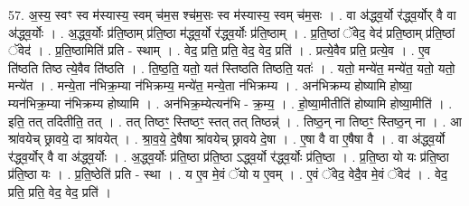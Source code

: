 \documentclass[17pt]{extarticle}
\begin{document}
57. अ॒स्य॒ स्वꣳ स्व म॑स्यास्य॒ स्वम् च॑म॒स श्च॑म॒सः स्व म॑स्यास्य॒ स्वम् च॑म॒सः । . वा अ॑द्ध्व॒र्यो र॑द्ध्व॒र्योर् वै वा अ॑द्ध्व॒र्योः । . अ॒द्ध्व॒र्योः प्र॑ति॒ष्ठाम् प्र॑ति॒ष्ठा म॑द्ध्व॒र्यो र॑द्ध्व॒र्योः प्र॑ति॒ष्ठाम् । . प्र॒ति॒ष्ठां ॅवेद॒ वेद॑ प्रति॒ष्ठाम् प्र॑ति॒ष्ठां ॅवेद॑ । . प्र॒ति॒ष्ठामिति॑ प्रति - स्थाम् । . वेद॒ प्रति॒ प्रति॒ वेद॒ वेद॒ प्रति॑ । . प्रत्ये॒वैव प्रति॒ प्रत्ये॒व । . ए॒व ति॑ष्ठति तिष्ठ त्ये॒वैव ति॑ष्ठति । . ति॒ष्ठ॒ति॒ यतो॒ यत॑ स्तिष्ठति तिष्ठति॒ यतः॑ । . यतो॒ मन्ये॑त॒ मन्ये॑त॒ यतो॒ यतो॒ मन्ये॑त । . मन्ये॒ता न॑भिक्र॒म्या न॑भिक्रम्य॒ मन्ये॑त॒ मन्ये॒ता न॑भिक्रम्य । . अन॑भिक्रम्य होष्यामि होष्या॒ म्यन॑भिक्र॒म्या न॑भिक्रम्य होष्यामि । . अन॑भिक्र॒म्येत्यन॑भि - क्र॒म्य॒ । . हो॒ष्या॒मीतीति॑ होष्यामि होष्या॒मीति॑ । . इति॒ तत् तदितीति॒ तत् । . तत् तिष्ठꣳ॒॒ स्तिष्ठꣳ॒॒ स्तत् तत् तिष्ठन्न्॑ । . तिष्ठ॒न् ना तिष्ठꣳ॒॒ स्तिष्ठ॒न् ना । . आ श्रा॑वयेच् छ्रावये॒ दा श्रा॑वयेत् । . श्रा॒व॒ये॒ दे॒षैषा श्रा॑वयेच् छ्रावये दे॒षा । . ए॒षा वै वा ए॒षैषा वै । . वा अ॑द्ध्व॒र्यो र॑द्ध्व॒र्योर् वै वा अ॑द्ध्व॒र्योः । . अ॒द्ध्व॒र्योः प्र॑ति॒ष्ठा प्र॑ति॒ष्ठा ऽद्ध्व॒र्यो र॑द्ध्व॒र्योः प्र॑ति॒ष्ठा । . प्र॒ति॒ष्ठा यो यः प्र॑ति॒ष्ठा प्र॑ति॒ष्ठा यः । . प्र॒ति॒ष्ठेति॑ प्रति - स्था । . य ए॒व मे॒वं ॅयो य ए॒वम् । . ए॒वं ॅवेद॒ वेदै॒व मे॒वं ॅवेद॑ । . वेद॒ प्रति॒ प्रति॒ वेद॒ वेद॒ प्रति॑ । \newline
\end{document}
